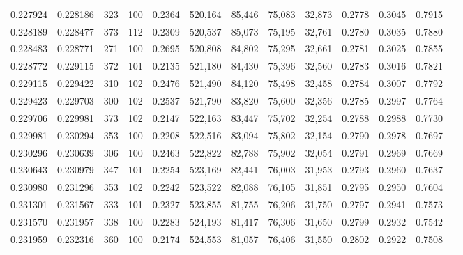 \begin{tabular}{rrrrrrrrrrrrr}
0.227924 & 0.228186 &   323 & 100 &                                     0.2364 & 520,164 &  85,446 &  75,083 &  32,873 & 0.2778 & 0.3045 & 0.7915 \\
0.228189 & 0.228477 &   373 & 112 &                                     0.2309 & 520,537 &  85,073 &  75,195 &  32,761 & 0.2780 & 0.3035 & 0.7880 \\
0.228483 & 0.228771 &   271 & 100 &                                     0.2695 & 520,808 &  84,802 &  75,295 &  32,661 & 0.2781 & 0.3025 & 0.7855 \\
0.228772 & 0.229115 &   372 & 101 &                                     0.2135 & 521,180 &  84,430 &  75,396 &  32,560 & 0.2783 & 0.3016 & 0.7821 \\
0.229115 & 0.229422 &   310 & 102 &                                     0.2476 & 521,490 &  84,120 &  75,498 &  32,458 & 0.2784 & 0.3007 & 0.7792 \\
0.229423 & 0.229703 &   300 & 102 &                                     0.2537 & 521,790 &  83,820 &  75,600 &  32,356 & 0.2785 & 0.2997 & 0.7764 \\
0.229706 & 0.229981 &   373 & 102 &                                     0.2147 & 522,163 &  83,447 &  75,702 &  32,254 & 0.2788 & 0.2988 & 0.7730 \\
0.229981 & 0.230294 &   353 & 100 &                                     0.2208 & 522,516 &  83,094 &  75,802 &  32,154 & 0.2790 & 0.2978 & 0.7697 \\
0.230296 & 0.230639 &   306 & 100 &                                     0.2463 & 522,822 &  82,788 &  75,902 &  32,054 & 0.2791 & 0.2969 & 0.7669 \\
0.230643 & 0.230979 &   347 & 101 &                                     0.2254 & 523,169 &  82,441 &  76,003 &  31,953 & 0.2793 & 0.2960 & 0.7637 \\
0.230980 & 0.231296 &   353 & 102 &                                     0.2242 & 523,522 &  82,088 &  76,105 &  31,851 & 0.2795 & 0.2950 & 0.7604 \\
0.231301 & 0.231567 &   333 & 101 &                                     0.2327 & 523,855 &  81,755 &  76,206 &  31,750 & 0.2797 & 0.2941 & 0.7573 \\
0.231570 & 0.231957 &   338 & 100 &                                     0.2283 & 524,193 &  81,417 &  76,306 &  31,650 & 0.2799 & 0.2932 & 0.7542 \\
0.231959 & 0.232316 &   360 & 100 &                                     0.2174 & 524,553 &  81,057 &  76,406 &  31,550 & 0.2802 & 0.2922 & 0.7508 \\

\end{tabular}
